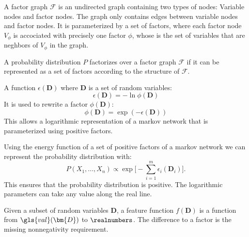 {%
  A factor graph $\mathcal{F}$ is an undirected \gls{graph} containing two types of \glspl{node}: Variable nodes and factor nodes. The graph only contains \glspl{edge} between variable nodes and factor nodes. It is parameterized by a set of \glspl{factor}, where each factor node $V_\phi$ is accociated with precisely one factor $\phi$, whose  is the set of variables that are neghbors of $V_\phi$ in the graph.
}

{%
  A \gls{probability distribution} $P$ factorizes over a \gls{factor graph} $\mathcal{F}$ if it can be represented as a set of \glspl{factor} according to the structure of $\mathcal{F}$.
}

{%
  A \gls{function} $\epsilon(\bm{D})$ where $\bm{D}$ is a \gls{set of random variables}:
  \begin{equation*}
    \epsilon(\bm{D})=-\ln\phi(\bm{D})
  \end{equation*}
  It is used to rewrite a \gls{factor} $\phi(\bm{D})$:
  \begin{equation*}
    \phi(\bm{D})=\exp(-\epsilon(\bm{D}))
  \end{equation*}
  This allows a \gls{logarithmic representation} of a \gls{markov network} that is parameterized using positive \glspl{factor}.
}

{%
  Using the \gls{energy function} of a set of positive \glspl{factor} of a \gls{markov network} we can represent the \gls{probability distribution} with:
  \begin{equation*}
    P(X_1,\dots,X_n)\propto\exp \Bigg[ -\sum_{i=1}^m \epsilon_i(\bm{D}_i) \Bigg].
  \end{equation*}
  This ensures that the probability distribution is positive. The logarithmic parameters can take any value along the real line.

}

{%
  Given a subset of \glspl{random variable} $\bm{D}$, a feature function $f(\bm{D})$ is a \gls{function} from $\gls{val}(\bm{D})$ to $\realnumbers$. The difference to a \gls{factor} is the missing nonnegativity requirement.
}

